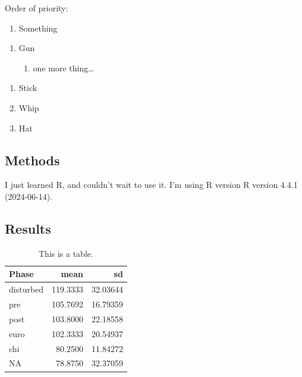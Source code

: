 \documentclass[
  letterpaper,
  DIV=11,
  numbers=noendperiod]{scrartcl}
\providecommand{\tightlist}{%
  \setlength{\itemsep}{0pt}\setlength{\parskip}{0pt}}\usepackage{longtable,booktabs,array}
\begin{document}
Order of priority:

\begin{enumerate}
\def\labelenumi{\arabic{enumi}.}
\tightlist
\item
  Something
\end{enumerate}

\begin{enumerate}
\def\labelenumi{\roman{enumi})}
\tightlist
\item
  Gun

  \begin{enumerate}
  \def\labelenumii{\alph{enumii}.}
  \tightlist
  \item
    one more thing\ldots{}
  \end{enumerate}
\end{enumerate}

\begin{enumerate}
\def\labelenumi{\arabic{enumi}.}
\setcounter{enumi}{1}
\tightlist
\item
  Stick
\item
  Whip
\item
  Hat
\end{enumerate}

\subsection{Methods}\label{methods}

I just learned R, and couldn't wait to use it. I'm using R version R
version 4.4.1 (2024-06-14).

\subsection{Results}\label{results}

\begin{longtable}[]{@{}lrr@{}}

\caption{\label{tbl-summary-stats}This is a table.}

\tabularnewline

\toprule\noalign{}
Phase & mean & sd \\
\midrule\noalign{}
\endhead
\bottomrule\noalign{}
\endlastfoot
disturbed & 119.3333 & 32.03644 \\
pre & 105.7692 & 16.79359 \\
post & 103.8000 & 22.18558 \\
euro & 102.3333 & 20.54937 \\
chi & 80.2500 & 11.84272 \\
NA & 78.8750 & 32.37059 \\

\end{longtable}
\end{document}

